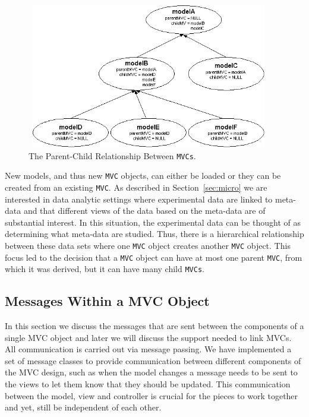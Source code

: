 \documentclass{article}[11pt]
\newcommand{\Robject}[1]{{\texttt{#1}}}
\begin{document}
\begin{figure}[ht]
  \begin{center}
    \includegraphics[height=2.5in, width=4.2in]{Hierarchy2.jpg}
    \caption{ The Parent-Child Relationship Between \Robject{MVCs}. }
    \label{Fig:Hier}
  \end{center}
\end{figure}

New models, and thus new \Robject{MVC} objects, can either be loaded
or they can be created from an existing \Robject{MVC}. As described in
Section~\ref{sec:micro} we are interested in data analytic settings
where experimental data are linked to meta-data and that different
views of the data based on the meta-data are of substantial interest.
In this situation, the experimental data can be thought of as
determining what meta-data are studied.  Thus, there is a hierarchical
relationship between these data sets where one \Robject{MVC} object
creates another \Robject{MVC} object.  This focus led to the decision
that a \Robject{MVC} object can have at most one parent \Robject{MVC},
from which it was derived, but it can have many child \Robject{MVCs}.

\subsection{Messages Within a MVC Object}
\label{Ssec:OneMess}

In this section we discuss the messages that are sent between the
components of a single MVC object and later we will discuss the
support needed to link MVCs.  All communication is carried out via
message passing. We have implemented a set of message classes to
provide communication between different components of the MVC design,
such as when the model changes a message needs to be sent to the views
to let them know that they should be updated.  This communication
between the model, view and controller is crucial for the pieces to
work together and yet, still be independent of each other.
\end{document}
